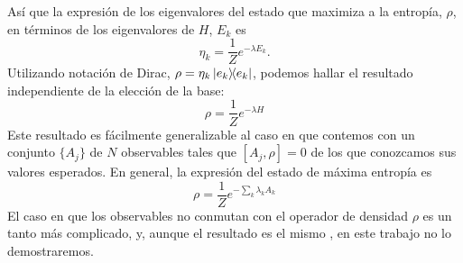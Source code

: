 Así que la expresión de los eigenvalores del estado que maximiza a la entropía, $\rho$, en términos de los eigenvalores de $H$, $E_{k}$ es
\begin{equation*}
    \eta_{k}=\frac{1}{Z}e^{-\lambda E_{k}}.
\end{equation*}
Utilizando notación de Dirac, $\rho=\eta_{k}\dyad{e_{k}}$, podemos hallar el resultado independiente de la elección de la base:
\begin{equation}
    \rho=\frac{1}{Z}e^{-\lambda H}
\end{equation}
Este resultado es fácilmente generalizable al caso en que contemos con un  conjunto $\{A_{j}\}$ de $N$ observables tales que $[A_{j},\rho]=0$ de los que conozcamos sus valores esperados. En general, la expresión del estado de máxima entropía es
\begin{equation}
    \rho=\frac{1}{Z}e^{-\sum_{k}\lambda_{k} A_{k}}
\end{equation}
El caso en que los observables no conmutan con el operador de densidad $\rho$ es un tanto más complicado, y, aunque el resultado es el mismo \cite{FormalJaynes}, en este trabajo no lo demostraremos.

